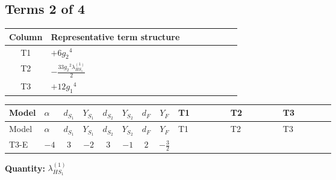 \documentclass[8pt]{article}
\begin{document}
\begin{landscape}
\subsection*{Terms 2 of 4}
\begin{center}
\begin{tabular}{@{}c >{\raggedright\arraybackslash}p{0.82\linewidth}@{}}
\toprule
Column & Representative term structure \\
\midrule
T1 & \(\displaystyle +6 {g_2}^4\) \\
\midrule
T2 & \(\displaystyle -\frac{33 {g_2}^2 {\lambda_{HS_1}^{(1)}}}{2}\) \\
\midrule
T3 & \(\displaystyle +12 {g_1}^4\) \\
\midrule
\bottomrule
\end{tabular}
\end{center}
\smallskip
\tiny
\begin{longtable}{@{}llcccccc >{\raggedright\arraybackslash}p{0.21\linewidth} >{\raggedright\arraybackslash}p{0.21\linewidth} >{\raggedright\arraybackslash}p{0.21\linewidth}@{}}
\toprule
Model & $\alpha$ & $d_{S_1}$ & $Y_{S_1}$ & $d_{S_2}$ & $Y_{S_2}$ & $d_F$ & $Y_F$ & T1 & T2 & T3 \\
\midrule
\endfirsthead
\toprule
Model & $\alpha$ & $d_{S_1}$ & $Y_{S_1}$ & $d_{S_2}$ & $Y_{S_2}$ & $d_F$ & $Y_F$ & T1 & T2 & T3 \\
\midrule
\endhead
T3-E & $-4$ & $3$ & $-2$ & $3$ & $-1$ & $2$ & $-\frac{3}{2}$ & \scriptsize\adjustbox{max width=\linewidth}{$\begin{gathered} +6 {g_2}^4\end{gathered}$} & \scriptsize\adjustbox{max width=\linewidth}{$\begin{gathered} -\frac{33 {g_2}^2 {\lambda_{HS_1}^{(1)}}}{2}\end{gathered}$} & \scriptsize\adjustbox{max width=\linewidth}{$\begin{gathered} +12 {g_1}^4\end{gathered}$} \\
\midrule
\bottomrule
\end{longtable}
\clearpage
\noindent\textbf{Quantity: }$\lambda_{HS_1}^{(1)}$\par\smallskip

\end{landscape}
\end{document}
